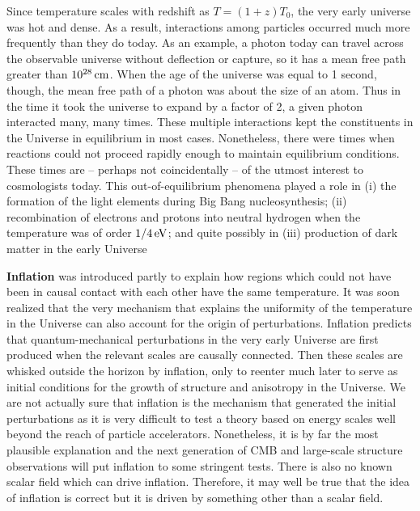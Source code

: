 \documentclass[a4paper,11pt]{article}
\begin{document}
Since temperature scales with redshift as $T=(1+z)T_0$, the very early universe was hot and dense. As a result, interactions among particles occurred much more frequently than they do today. As an example, a photon today can travel across the observable universe without deflection or capture, so it has a mean free path greater than $10^{28}\,{\rm cm}$. When the age of the universe was equal to 1 second, though, the mean free path of a photon was about the size of an atom. Thus in the time it took the universe to expand by a factor of 2, a given photon interacted many, many times. These multiple interactions kept the constituents in the Universe in equilibrium in most cases. Nonetheless, there were times when reactions could not proceed rapidly enough to maintain equilibrium conditions. These times are -- perhaps not coincidentally -- of the utmost interest to cosmologists today. This out-of-equilibrium phenomena played a role in (i) the formation of the light elements during Big Bang nucleosynthesis; (ii) recombination of electrons and protons into neutral hydrogen when the temperature was of order $1/4\,{\rm eV}$; and quite possibly in (iii) production of dark matter in the early Universe

\textbf{Inflation} was introduced partly to explain how regions which could not have been in causal contact with each other have the same temperature. It was soon realized that the very mechanism that explains the uniformity of the temperature in the Universe can also account for the origin of perturbations. Inflation predicts that quantum-mechanical perturbations in the very early Universe are first produced when the relevant scales are causally connected. Then these scales are whisked outside the horizon by inflation, only to reenter much later to serve as initial conditions for the growth of structure and anisotropy in the Universe. We are not actually sure that inflation is the mechanism that generated the initial perturbations as it is very difficult to test a theory based on energy scales well beyond the reach of particle accelerators. Nonetheless, it is by far the most plausible explanation and the next generation of CMB and large-scale structure observations will put inflation to some stringent tests. There is also no known scalar field which can drive inflation. Therefore, it may well be true that the idea of inflation is correct but it is driven by something other than a scalar field.
\end{document}
